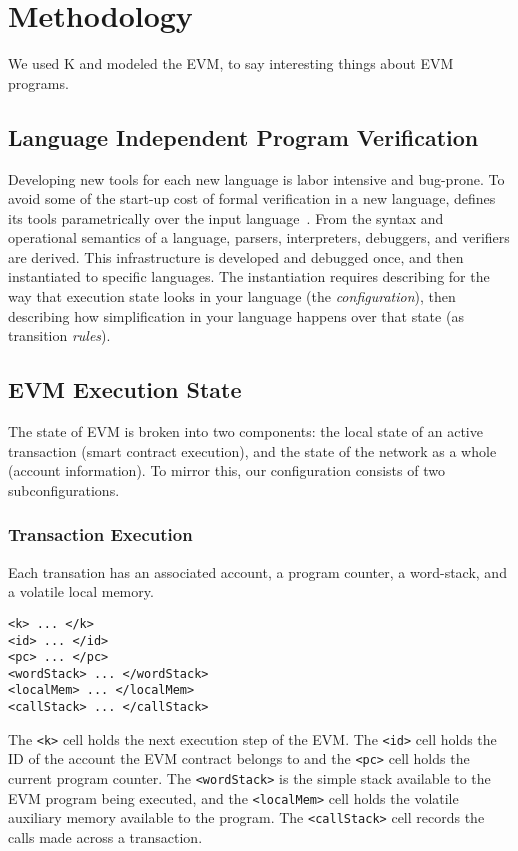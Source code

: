 \section{Methodology}

We used K and modeled the EVM, to say interesting things about EVM programs.

\subsection{Language Independent Program Verification}

Developing new tools for each new language is labor intensive and bug-prone. To
avoid some of the start-up cost of formal verification in a new language, \K
defines its tools parametrically over the input language~\cite{inproceedings}.
From the syntax and operational semantics of a language, parsers, interpreters,
debuggers, and verifiers are derived. This infrastructure is developed and
debugged once, and then instantiated to specific languages. The instantiation
requires describing for \K the way that execution state looks in your language
(the \textit{configuration}), then describing how simplification in your
language happens over that state (as transition \textit{rules}).

\subsection{EVM Execution State}

The state of EVM is broken into two components: the local state of an active
transaction (smart contract execution), and the state of the network as a whole
(account information). To mirror this, our configuration consists of two
subconfigurations.

\subsubsection{Transaction Execution}

Each transation has an associated account, a program counter, a word-stack, and
a volatile local memory.

\begin{verbatim}
<k> ... </k>
<id> ... </id>
<pc> ... </pc>
<wordStack> ... </wordStack>
<localMem> ... </localMem>
<callStack> ... </callStack>
\end{verbatim}

The \texttt{<k>} cell holds the next execution step of the EVM.  The
\texttt{<id>} cell holds the ID of the account the EVM contract belongs to and
the \texttt{<pc>} cell holds the current program counter. The
\texttt{<wordStack>} is the simple stack available to the EVM program being
executed, and the \texttt{<localMem>} cell holds the volatile auxiliary memory
available to the program. The \texttt{<callStack>} cell records the calls made
across a transaction.

